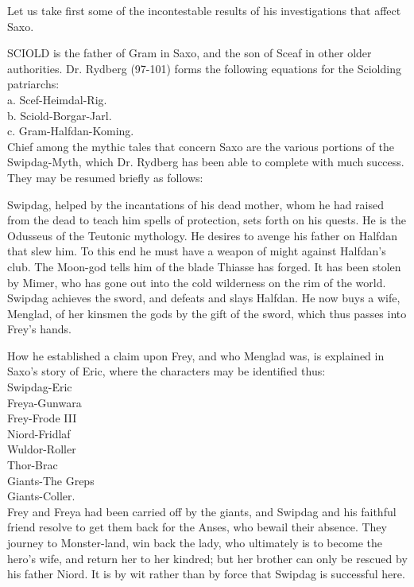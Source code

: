 \documentclass[10pt,a4paper]{report}
\begin{document}
Let us take first some of the incontestable results of his investigations that affect Saxo.

SCIOLD is the father of Gram in Saxo, and the son of Sceaf in other older authorities. Dr. Rydberg (97-101) forms the following equations for the Sciolding patriarchs:\\

\indent a. Scef-Heimdal-Rig.\\
\indent b. Sciold-Borgar-Jarl.\\
\indent c. Gram-Halfdan-Koming.\\

Chief among the mythic tales that concern Saxo are the various portions of the Swipdag-Myth, which Dr. Rydberg has been able to complete with much success. They may be resumed briefly as follows:

Swipdag, helped by the incantations of his dead mother, whom he had raised from the dead to teach him spells of protection, sets forth on his quests. He is the Odusseus of the Teutonic mythology. He desires to avenge his father on Halfdan that slew him. To this end he must have a weapon of might against Halfdan's club. The Moon-god tells him of the blade Thiasse has forged. It has been stolen by Mimer, who has gone out into the cold wilderness on the rim of the world. Swipdag achieves the sword, and defeats and slays Halfdan. He now buys a wife, Menglad, of her kinsmen the gods by the gift of the sword, which thus passes into Frey's hands.

How he established a claim upon Frey, and who Menglad was, is explained in Saxo's story of Eric, where the characters may be identified thus:\\

\indent Swipdag-Eric\\
\indent Freya-Gunwara\\
\indent Frey-Frode III\\
\indent Niord-Fridlaf\\
\indent Wuldor-Roller\\
\indent Thor-Brac\\
\indent Giants-The Greps\\
\indent Giants-Coller.\\

Frey and Freya had been carried off by the giants, and Swipdag and his faithful friend resolve to get them back for the Anses, who bewail their absence. They journey to Monster-land, win back the lady, who ultimately is to become the hero's wife, and return her to her kindred; but her brother can only be rescued by his father Niord. It is by wit rather than by force that Swipdag is successful here.
\end{document}

